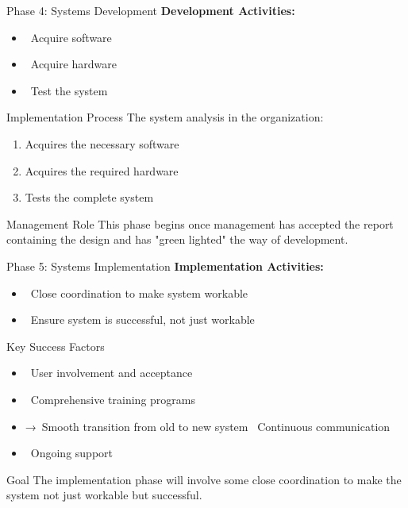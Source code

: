 \documentclass[aspectratio=169]{beamer}
\begin{document}
\begin{frame}{Phase 4: Systems Development}
    \textbf{Development Activities:}
    \begin{itemize}
        \item \faLaptopCode\, Acquire software
        \item \faServer\, Acquire hardware
        \item\, Test the system
    \end{itemize}
    
    \vspace{0.2cm}
    \begin{block}{Implementation Process}
        The system analysis in the organization:
        \begin{enumerate}
            \item Acquires the necessary software
            \item Acquires the required hardware
            \item Tests the complete system
        \end{enumerate}
    \end{block}
    
    \vspace{0.2cm}
    \begin{alertblock}{Management Role}
        This phase begins once management has accepted the report containing the design and has "green lighted" the way of development.
    \end{alertblock}
\end{frame}

\begin{frame}{Phase 5: Systems Implementation}
    \textbf{Implementation Activities:}
    \begin{itemize}
        \item\, Close coordination to make system workable
        \item\, Ensure system is successful, not just workable
    \end{itemize}
    
    \vspace{0.2cm}
    \begin{block}{Key Success Factors}
        \begin{itemize}
            \item \faServerCog\, User involvement and acceptance
            \item\, Comprehensive training programs
            \item →\, Smooth transition from old to new system
            \items\, Continuous communication
            \item\, Ongoing support
        \end{itemize}
    \end{block}
    
    \vspace{0.1cm}
    \begin{exampleblock}{Goal}
        The implementation phase will involve some close coordination to make the system not just workable but successful.
    \end{exampleblock}
\end{frame}
\end{document}
